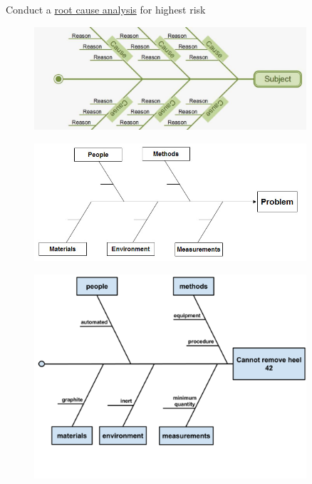 \documentclass[aspectratio=1610,pdftex,dvipsnames,compress,xcolor={dvipsnames}]{beamer}
\begin{document}
\addtocounter{framenumber}{-1}
\begin{frame}{Conduct a \href{https://uidaho.pressbooks.pub/riskassessment/chapter/failure-mode-and-effects-analysis/}{root cause analysis} for highest risk}
    \begin{figure}
        \centering
        \includegraphics[width=0.90\textwidth]{root.cause.1.jpg}
    \end{figure}
\end{frame}


\begin{frame}{}
    \begin{figure}
        \centering
        \includegraphics[width=0.90\textwidth]{root.cause.2.jpg}
    \end{figure}
\end{frame}


\begin{frame}{}
    \begin{figure}
        \centering
        \includegraphics[width=0.90\textwidth]{fuel.fabrication.root.cause.jpg}
    \end{figure}
\end{frame}
\end{document}
